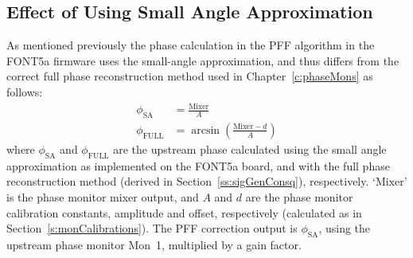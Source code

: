 \subsection{Effect of Using Small Angle Approximation}
\label{ss:fontSmallAng}

As mentioned previously the phase calculation in the PFF algorithm in the FONT5a firmware uses the small-angle approximation, and thus differs from the correct full phase reconstruction method used in Chapter~\ref{c:phaseMons} as follows:
\begin{align}
\phi_{\mathrm{SA}} &= \frac{\mathrm{Mixer}}{A} \\
\phi_{\mathrm{FULL}} &= \arcsin\left(\frac{\mathrm{Mixer}-d}{A}\right)
\end{align}
where \(\phi_{\mathrm{SA}}\) and \(\phi_{\mathrm{FULL}}\) are the upstream phase calculated using the small angle approximation as implemented on the FONT5a board,
and with the full phase reconstruction method (derived in Section~\ref{ss:sigGenConsq}), respectively. `\(\mathrm{Mixer}\)' is the phase monitor mixer output, and \(A\) and \(d\) are the phase monitor calibration constants, amplitude and offset, respectively (calculated as in Section~\ref{s:monCalibrations}).
The PFF correction output is \(\phi_{\mathrm{SA}}\), using the upstream 
phase monitor Mon~1, multiplied by a gain factor.


